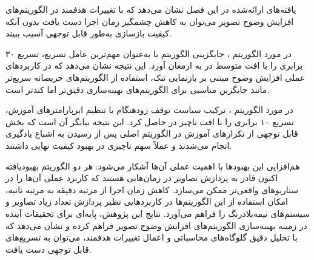 یافته‌های ارائه‌شده در این فصل نشان می‌دهد که با تغییرات هدفمند در الگوریتم‌های افزایش وضوح تصویر می‌توان به کاهش چشمگیر زمان اجرا دست یافت بدون آنکه کیفیت بازسازی به‌طور قابل توجهی آسیب ببیند.

در مورد الگوریتم ، جایگزینی الگوریتم  با  به‌عنوان مهم‌ترین عامل تسریع، تسریع ۳۰ برابری را با افت متوسط  در  به ارمغان آورد. این نتیجه نشان می‌دهد که در کاربردهای عملی افزایش وضوح مبتنی بر بازنمایی تنک، استفاده از الگوریتم‌های حریصانه سریع‌تر مانند  جایگزین مناسبی برای الگوریتم‌های بهینه‌سازی دقیق‌تر اما کندتر است.

در مورد الگوریتم ، ترکیب سیاست توقف زودهنگام با تنظیم ابرپارامترهای آموزش، تسریع ۱۰ برابری را با افت ناچیز  در  حاصل کرد. این نتیجه بیانگر آن است که بخش قابل توجهی از تکرارهای آموزش در الگوریتم اصلی پس از رسیدن به اشباع یادگیری انجام می‌شدند و عملاً سهم ناچیزی در بهبود کیفیت نهایی داشتند.

هم‌افزایی این بهبودها با اهمیت عملی آن‌ها آشکار می‌شود: هر دو الگوریتم بهبودیافته اکنون قادر به پردازش تصاویر در زمان‌هایی هستند که کاربرد عملی آن‌ها را در سناریوهای واقعی‌تر ممکن می‌سازد. کاهش زمان اجرا از مرتبه دقیقه به مرتبه ثانیه، امکان استفاده از این الگوریتم‌ها در کاربردهایی نظیر پردازش تعداد زیاد تصاویر و سیستم‌های نیمه‌بلادرنگ را فراهم می‌آورد. نتایج این پژوهش، پایه‌ای برای تحقیقات آینده در زمینه بهینه‌سازی الگوریتم‌های افزایش وضوح تصویر فراهم کرده و نشان می‌دهد که با تحلیل دقیق گلوگاه‌های محاسباتی و اعمال تغییرات هدفمند، می‌توان به تسریع‌های قابل توجهی دست یافت.

